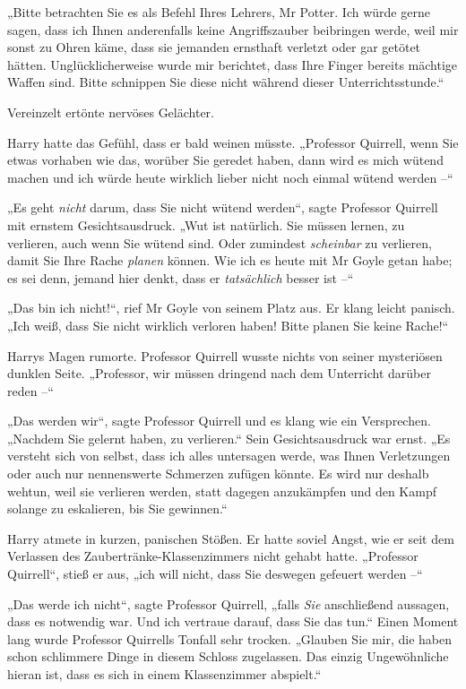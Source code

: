 {„Bitte betrachten Sie es als Befehl Ihres Lehrers, Mr Potter. Ich würde gerne sagen, dass ich Ihnen anderenfalls keine Angriffszauber beibringen werde, weil mir sonst zu Ohren käme, dass sie jemanden ernsthaft verletzt oder gar getötet hätten. Unglücklicherweise wurde mir berichtet, dass Ihre Finger bereits mächtige Waffen sind. Bitte schnippen Sie diese nicht während dieser Unterrichtsstunde.“

Vereinzelt ertönte nervöses Gelächter.

Harry hatte das Gefühl, dass er bald weinen müsste. „Professor Quirrell, wenn Sie etwas vorhaben wie das, worüber Sie geredet haben, dann wird es mich wütend machen und ich würde heute wirklich lieber nicht noch einmal wütend werden --“

„Es geht \emph{nicht} darum, dass Sie nicht wütend werden“, sagte Professor Quirrell mit ernstem Gesichtsausdruck. „Wut ist natürlich. Sie müssen lernen, zu verlieren, auch wenn Sie wütend sind. Oder zumindest \emph{scheinbar} zu verlieren, damit Sie Ihre Rache \emph{planen} können. Wie ich es heute mit Mr Goyle getan habe; es sei denn, jemand hier denkt, dass er \emph{tatsächlich} besser ist --“

„Das bin ich nicht!“, rief Mr Goyle von seinem Platz aus. Er klang leicht panisch. „Ich weiß, dass Sie nicht wirklich verloren haben! Bitte planen Sie keine Rache!“

Harrys Magen rumorte. Professor Quirrell wusste nichts von seiner mysteriösen dunklen Seite. „Professor, wir müssen dringend nach dem Unterricht darüber reden --“

„Das werden wir“, sagte Professor Quirrell und es klang wie ein Versprechen. „Nachdem Sie gelernt haben, zu verlieren.“ Sein Gesichtsausdruck war ernst. „Es versteht sich von selbst, dass ich alles untersagen werde, was Ihnen Verletzungen oder auch nur nennenswerte Schmerzen zufügen könnte. Es wird nur deshalb wehtun, weil sie verlieren werden, statt dagegen anzukämpfen und den Kampf solange zu eskalieren, bis Sie gewinnen.“

Harry atmete in kurzen, panischen Stößen. Er hatte soviel Angst, wie er seit dem Verlassen des Zaubertränke-Klassenzimmers nicht gehabt hatte. „Professor Quirrell“, stieß er aus, „ich will nicht, dass Sie deswegen gefeuert werden --“

„Das werde ich nicht“, sagte Professor Quirrell, „falls \emph{Sie} anschließend aussagen, dass es notwendig war. Und ich vertraue darauf, dass Sie das tun.“ Einen Moment lang wurde Professor Quirrells Tonfall sehr trocken. „Glauben Sie mir, die haben schon schlimmere Dinge in diesem Schloss zugelassen. Das einzig Ungewöhnliche hieran ist, dass es sich in einem Klassenzimmer abspielt.“

}
